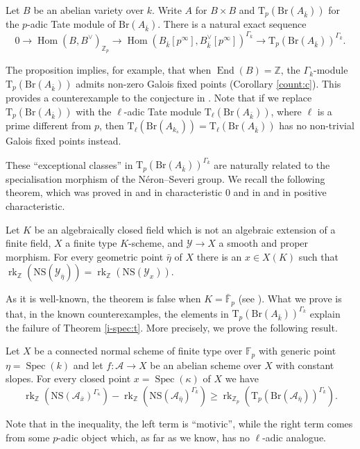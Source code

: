 \documentclass[11pt]{amsart}
\newcommand{\spa}{\medskip}
\newcommand{\F}{\mathbb{F}}
\newcommand{\Fp}{\mathbb{F}_p}
\newcommand{\Z}{\mathbb{Z}}
\newcommand{\kbar}{{\bar{k}}}
\newcommand{\Zp}{{\mathbb{Z}_{p}}}
\newcommand{\calA}{\mathcal{A}}
\newcommand{\calY}{\mathcal{Y}}
\DeclareMathOperator{\Spec}{Spec}
\DeclareMathOperator{\Hom}{Hom}
\DeclareMathOperator{\End}{End}
\DeclareMathOperator{\rk}{rk}
\newcommand{\Br}{\mathrm{Br}}
\newcommand{\NS}{\mathrm{NS}}
\newcommand{\ks}{{k_s}}
\newcommand{\Tp}{\mathrm{T}_p}
\newcommand{\Tl}{\mathrm{T_\ell}}
\begin{document}
\begin{prop}\label{i-counter:p}
	Let $B$ be an abelian variety over $k$. Write $A$ for $B\times B$ and $\Tp(\Br(A_\kbar))$ for the $p$-adic Tate module of $\Br(A_\kbar)$. There is a natural exact sequence		$$0\to \Hom(B,B^\vee)_\Zp\to \Hom(B_\kbar[p^\infty],B_\kbar^\vee[p^\infty])^{\Gamma_k}\to \Tp(\Br(A_\kbar))^{\Gamma_k}.$$
	

\end{prop}

	The proposition implies, for example, that when $\End(B)=\Z$, the $\Gamma_k$-module $\Tp(\mathrm{Br}(A_{\bar{k}}))$ admits non-zero Galois fixed points (Corollary \ref{count:c}). This provides a counterexample to the conjecture in \cite[§7.3.1]{Ulm14}. Note that if we replace $\Tp(\mathrm{Br}(A_{\bar{k}}))$ with the $\ell$-adic Tate module $\Tl(\mathrm{Br}(A_{\bar{k}}))$, where $\ell$ is a prime different from $p$, then $\Tl(\mathrm{Br}(A_{\ks}))=\Tl(\mathrm{Br}(A_{\bar{k}}))$ has no non-trivial Galois fixed points instead. 
	
	\spa
	
	
	These “exceptional classes” in $\Tp(\Br(A_\kbar))^{\Gamma_k}$ are naturally related to the specialisation morphism of the Néron--Severi group. We recall the following theorem, which was proved in \cite[Thm. 5.2]{And96} and \cite{MP12} in characteristic $0$ and in \cite{Amb18} and \cite{Chr18} in positive characteristic. 
	
	\begin{theo}\label{i-spec:t}
Let $K$ be an algebraically closed field which is not an algebraic extension of a finite field, $X$ a finite type $K$-scheme, and $\calY\to X$ a smooth and proper morphism. For every geometric point $\bar{\eta}$ of $X$ there is an $x\in X(K)$ such that $\rk_\Z(\NS(\calY_{\bar{\eta}}))=\rk_\Z(\NS(\calY_x))$.
	\end{theo}
	
	As it is well-known, the theorem is false when $K=\bar{\F}_p$ (see \cite[Rmk. 1.12]{MP12}). What we prove is that, in the known counterexamples, the elements in $\Tp(\Br(A_\kbar))^{\Gamma_k}$ explain the failure of Theorem \ref{i-spec:t}. More precisely, we prove the following result.

\begin{theo}\label{i-NS:t}
	Let $X$ be a connected normal scheme of finite type over $\Fp$ with generic point $\eta=\Spec(k)$ and let $f:\calA\to X$ be an abelian scheme over $X$ with constant slopes. For every closed point $x=\Spec(\kappa)$ of $X$ we have $$\rk_\Z(\NS(\calA_{\bar{x}})^{\Gamma_\kappa})-\rk_\Z(\NS(\calA_{\bar{\eta}})^{\Gamma_k})\geq \rk_\Zp ( \Tp(\Br(\calA_{\bar{\eta}}))^{\Gamma_k}).$$
\end{theo}
Note that in the inequality, the left term is “motivic”, while the right term comes from some $p$-adic object which, as far as we know, has no $\ell$-adic analogue. 
\end{document}
